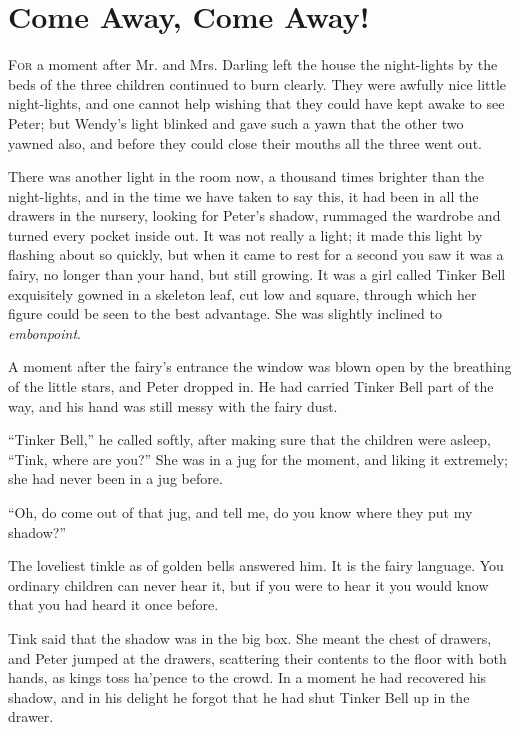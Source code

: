 \chapter{Come Away, Come Away!}

\lettrine{F}{or} a moment after Mr. and Mrs. Darling left the house the
night-lights by the beds of the three children continued to burn clearly.
They were awfully nice little night-lights, and one cannot help wishing that
they could have kept awake to see Peter; but Wendy's light blinked and gave such
a yawn that the other two yawned also, and before they could close their mouths
all the three went out.

There was another light in the room now, a thousand times brighter than the
night-lights, and in the time we have taken to say this, it had been in all the
drawers in the nursery, looking for Peter's shadow, rummaged the wardrobe and
turned every pocket inside out.
It was not really a light; it made this light by flashing about so quickly, but
when it came to rest for a second you saw it was a fairy, no longer than your
hand, but still growing.
It was a girl called Tinker Bell exquisitely gowned in a skeleton leaf, cut low
and square, through which her figure could be seen to the best advantage.
She was slightly inclined to \emph{embonpoint}.

A moment after the fairy's entrance the window was blown open by the breathing
of the little stars, and Peter dropped in.
He had carried Tinker Bell part of the way, and his hand was still messy with
the fairy dust.

``Tinker Bell,'' he called softly, after making sure that the children were
asleep, ``Tink, where are you?'' She was in a jug for the moment, and liking it
extremely; she had never been in a jug before.

``Oh, do come out of that jug, and tell me, do you know where they put my
shadow?''

The loveliest tinkle as of golden bells answered him.
It is the fairy language.
You ordinary children can never hear it, but if you were to hear it you would
know that you had heard it once before.

Tink said that the shadow was in the big box.
She meant the chest of drawers, and Peter jumped at the drawers, scattering
their contents to the floor with both hands, as kings toss ha'pence to the
crowd.
In a moment he had recovered his shadow, and in his delight he forgot that he
had shut Tinker Bell up in the drawer.

